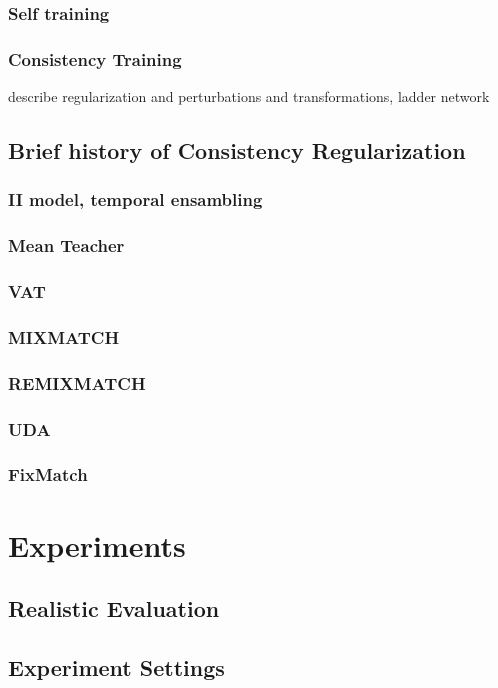 \documentclass[12pt]{article}
\begin{document}
            \subsubsection{Self training}
            \subsubsection{Consistency Training}
                describe regularization and perturbations and transformations, ladder network
        \subsection{Brief history of Consistency Regularization}
             \subsubsection{II model, temporal ensambling}
             \subsubsection{Mean Teacher}
             \subsubsection{VAT}
             \subsubsection{MIXMATCH}
             \subsubsection{REMIXMATCH}
             \subsubsection{UDA}
             \subsubsection{FixMatch}
             
\section{Experiments}
    \subsection{Realistic Evaluation}
    \subsection{Experiment Settings}
\end{document}
